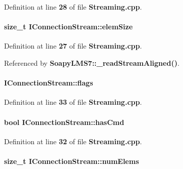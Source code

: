 Definition at line {\bf 28} of file {\bf Streaming.\+cpp}.

\paragraph[{elem\+Size}]{\setlength{\rightskip}{0pt plus 5cm}size\+\_\+t I\+Connection\+Stream\+::elem\+Size}\label{structIConnectionStream_a02f3a4e013ca02cab20557d3f6254fad}


Definition at line {\bf 27} of file {\bf Streaming.\+cpp}.



Referenced by {\bf Soapy\+L\+M\+S7\+::\+\_\+read\+Stream\+Aligned()}.

\paragraph[{flags}]{ I\+Connection\+Stream\+::flags}\label{structIConnectionStream_ad5749cb6bbbfafe8c4dc25569e455dcc}


Definition at line {\bf 33} of file {\bf Streaming.\+cpp}.

\paragraph[{has\+Cmd}]{\setlength{\rightskip}{0pt plus 5cm}bool I\+Connection\+Stream\+::has\+Cmd}\label{structIConnectionStream_a19e614052946e472698dc5698bb0e35b}


Definition at line {\bf 32} of file {\bf Streaming.\+cpp}.

\paragraph[{num\+Elems}]{\setlength{\rightskip}{0pt plus 5cm}size\+\_\+t I\+Connection\+Stream\+::num\+Elems}\label{structIConnectionStream_ac5909245367e55af04d5ab3d5aae20a1}


